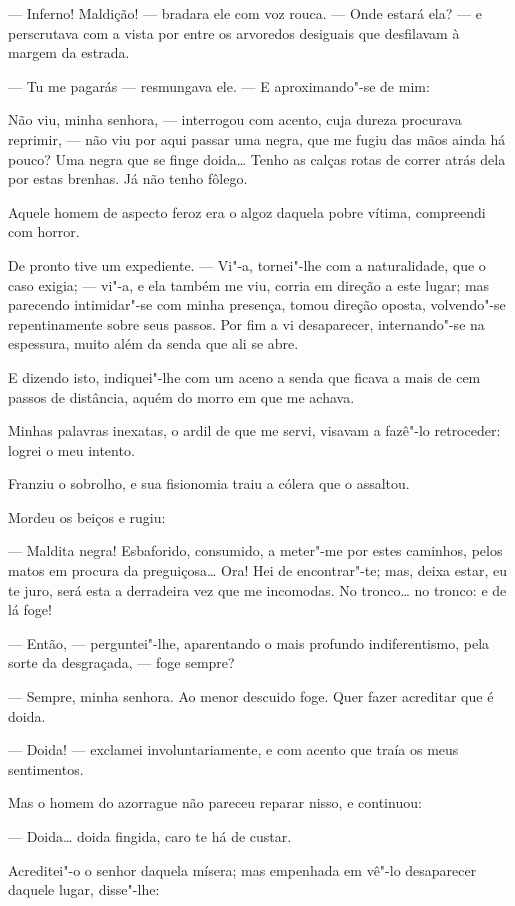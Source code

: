 --- Inferno! Maldição! --- bradara ele com voz rouca. --- Onde estará
ela? --- e perscrutava com a vista por entre os arvoredos desiguais que
desfilavam à margem da estrada.

--- Tu me pagarás --- resmungava ele. --- E aproximando"-se de mim:

Não viu, minha senhora, --- interrogou com acento, cuja dureza procurava
reprimir, --- não viu por aqui passar uma negra, que me fugiu das mãos
ainda há pouco? Uma negra que se finge doida\ldots{} Tenho as calças rotas de
correr atrás dela por estas brenhas. Já não tenho fôlego.

Aquele homem de aspecto feroz era o algoz daquela pobre vítima,
compreendi com horror.

De pronto tive um expediente. --- Vi"-a, tornei"-lhe com a naturalidade,
que o caso exigia; --- vi"-a, e ela também me viu, corria em direção a
este lugar; mas parecendo intimidar"-se com minha presença, tomou direção
oposta, volvendo"-se repentinamente sobre seus passos. Por fim a vi
desaparecer, internando"-se na espessura, muito além da senda que ali se
abre.

E dizendo isto, indiquei"-lhe com um aceno a senda que ficava a mais de
cem passos de distância, aquém do morro em que me achava.

Minhas palavras inexatas, o ardil de que me servi, visavam a fazê"-lo
retroceder: logrei o meu intento.

Franziu o sobrolho, e sua fisionomia traiu a cólera que o assaltou.

Mordeu os beiços e rugiu:

--- Maldita negra! Esbaforido, consumido, a meter"-me por estes caminhos,
pelos matos em procura da preguiçosa\ldots{} Ora! Hei de encontrar"-te; mas,
deixa estar, eu te juro, será esta a derradeira vez que me incomodas. No
tronco\ldots{} no tronco: e de lá foge!

--- Então, --- perguntei"-lhe, aparentando o mais profundo indiferentismo,
pela sorte da desgraçada, --- foge sempre?

--- Sempre, minha senhora. Ao menor descuido foge. Quer fazer acreditar
que é doida.

--- Doida! --- exclamei involuntariamente, e com acento que traía os meus
sentimentos.

Mas o homem do azorrague não pareceu reparar nisso, e continuou:

--- Doida\ldots{} doida fingida, caro te há de custar.

Acreditei"-o o senhor daquela mísera; mas empenhada em vê"-lo desaparecer
daquele lugar, disse"-lhe:

